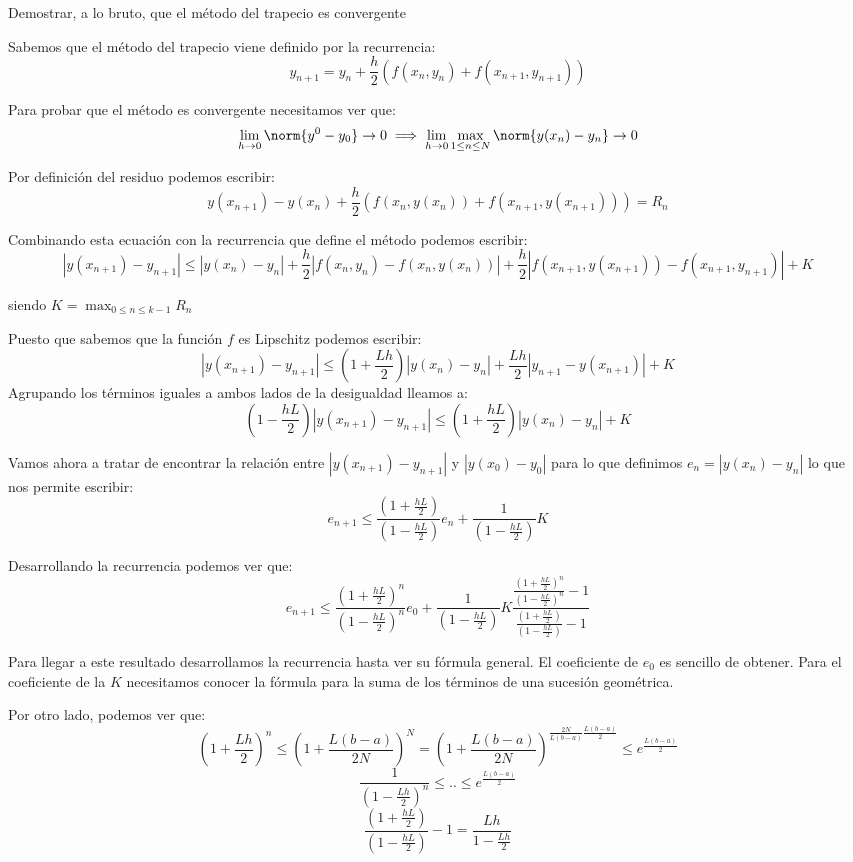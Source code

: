 \begin{problem}[2]
Demostrar, a lo bruto, que el método del trapecio es convergente

\solution

Sabemos que el método del trapecio viene definido por la recurrencia:
\[y_{n+1} = y_n +\frac{h}{2}\left(f(x_n,y_n)+f(x_{n+1},y_{n+1}) \right)\]

Para probar que el método es convergente necesitamos ver que:
\[\lim_{h \to 0 } \norm{y^0-y_0} \to 0 \implies \lim_{h\to 0} \max_{1 \leq n \leq N}\norm{y(x_n)-y_n} \to 0\]

Por definición del residuo podemos escribir:
\[y(x_{n+1}) - y(x_n) +\frac{h}{2}\left(f(x_n,y(x_n))+f(x_{n+1},y(x_{n+1})) \right) = R_n\]

Combinando esta ecuación con la recurrencia que define el método podemos escribir:
\[|y(x_{n+1})-y_{n+1}| \leq |y(x_n)-y_n|+\frac{h}{2}|f(x_n,y_n)-f(x_n,y(x_n))|+\frac{h}{2}|f(x_{n+1},y(x_{n+1}))-f(x_{n+1},y_{n+1})|+K\]

siendo $K=\max_{0 \leq n \leq k-1} R_n$

Puesto que sabemos que la función $f$ es Lipschitz podemos escribir:
\[|y(x_{n+1})-y_{n+1}| \leq \left( 1 + \frac{Lh}{2}\right)|y(x_n)-y_n|+\frac{Lh}{2}|y_{n+1}-y(x_{n+1})| + K\]
Agrupando los términos iguales a ambos lados de la desigualdad lleamos a:
\[\left(1- \frac{hL}{2}\right)|y(x_{n+1})-y_{n+1}| \leq \left(1+ \frac{hL}{2}\right)|y(x_n)-y_n| + K\]

Vamos ahora a tratar de encontrar la relación entre $|y(x_{n+1})-y_{n+1}|$ y $|y(x_0)-y_0|$ para lo que definimos $e_n=|y(x_{n})-y_{n}|$ lo que nos permite escribir:
\[e_{n+1} \leq \frac{\left(1+ \frac{hL}{2}\right)}{\left(1- \frac{hL}{2}\right)}e_n + \frac{1}{\left(1- \frac{hL}{2}\right)}K\]

Desarrollando la recurrencia podemos ver que:
\[e_{n+1} \leq \frac{\left(1+ \frac{hL}{2}\right)^n}{\left(1- \frac{hL}{2}\right)^n}e_0 + \frac{1}{\left(1- \frac{hL}{2}\right)}K\frac{\frac{\left(1+ \frac{hL}{2}\right)^n}{\left(1- \frac{hL}{2}\right)^n}-1}{\frac{\left(1+ \frac{hL}{2}\right)}{\left(1- \frac{hL}{2}\right)}-1}\]

\obs Para llegar a este resultado desarrollamos la recurrencia hasta ver su fórmula general. El coeficiente de $e_0$ es sencillo de obtener. Para el coeficiente de la $K$ necesitamos conocer la fórmula para la suma de los términos de una sucesión geométrica.

Por otro lado, podemos ver que:
\[\left( 1 + \frac{Lh}{2} \right)^n \leq \left( 1 + \frac{L(b-a)}{2N}\right)^N=\left(1 + \frac{L(b-a)}{2N}\right)^{\frac{2N}{L(b-a)}\frac{L(b-a)}{2}}\leq e^{\frac{L(b-a)}{2}}\]
\[\frac{1}{\left( 1-\frac{Lh}{2}\right)^n} \leq .. \leq e^{\frac{L(b-a)}{2}}\]
\[\frac{\left(1+ \frac{hL}{2}\right)}{\left(1- \frac{hL}{2}\right)}-1 = \frac{Lh}{1-\frac{Lh}{2}}\]


\end{problem}
